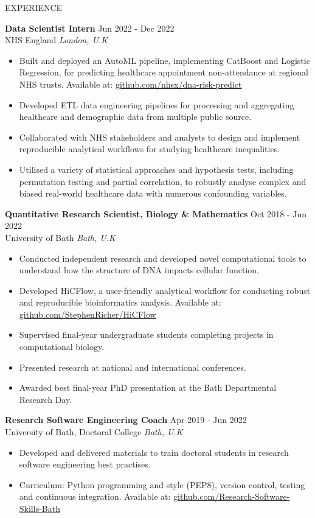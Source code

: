 \documentclass{resume} %
\begin{document}
\begin{rSection}{EXPERIENCE}

\textbf{Data Scientist Intern} \hfill Jun 2022 - Dec 2022 \\
NHS England \hfill \textit{London, U.K}
 \begin{itemize}
    \itemsep -3pt {} 
    \item Built and deployed an AutoML pipeline, implementing CatBoost and Logistic Regression, for predicting healthcare appointment non-attendance at regional NHS trusts. Available at: \href{https://github.com/nhsx/dna-risk-predict}{github.com/nhsx/dna-risk-predict}
    \item Developed ETL data engineering pipelines for processing and aggregating healthcare and demographic data from multiple public source.
    \item Collaborated with NHS stakeholders and analysts to design and implement reproducible analytical workflows for studying healthcare inequalities.
    \item Utilised a variety of statistical approaches and hypothesis tests, including permutation testing and partial correlation, to robustly analyse complex and biased real-world healthcare data with numerous confounding variables.
 \end{itemize}

\textbf{Quantitative Research Scientist, Biology \& Mathematics} \hfill Oct 2018 - Jun 2022 \\
University of Bath \hfill \textit{Bath, U.K}
 \begin{itemize}
    \itemsep -3pt {} 
    \item Conducted independent research and developed novel computational tools to understand how the structure of DNA impacts cellular function.
    \item Developed HiCFlow, a user-friendly analytical workflow for conducting robust and reproducible bioinformatics analysis. Available at: \href{https://github.com/StephenRicher/HiCFlow}{github.com/StephenRicher/HiCFlow}
    \item Supervised final-year undergraduate students completing projects in computational biology.
    \item Presented research at national and international conferences.
    \item Awarded best final-year PhD presentation at the Bath Departmental Research Day.
 \end{itemize}

\textbf{Research Software Engineering Coach} \hfill Apr 2019 - Jun 2022 \\
University of Bath, Doctoral College \hfill \textit{Bath, U.K}
 \begin{itemize}
    \itemsep -3pt {} 
    \item Developed and delivered materials to train doctoral students in research software engineering best practises.
    \item Curriculum: Python programming and style (PEP8), version control, testing and continuous integration. Available at: \href{https://github.com/Research-Software-Skills-Bath}{github.com/Research-Software-Skills-Bath}
 \end{itemize}


\end{rSection}
\end{document}
